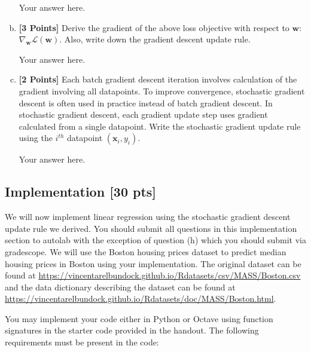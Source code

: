 \documentclass[a4paper]{article}
\theoremstyle{definition}
\def\x{\mathbf x}
\newenvironment{soln}{
    \leavevmode\color{red}\ignorespaces
}{}
\begin{document}
\begin{enumerate}[(a)]
\begin{soln}
Your answer here.
\end{soln}

\item {\bf [3 Points]} Derive the gradient of the above loss objective with respect to $\mathbf{w}$: $\nabla_{\mathbf{w}} \mathcal{L}(\mathbf{w})$. Also, write down the gradient descent update rule.

\begin{soln}
Your answer here.
\end{soln}

\item {\bf [2 Points]} Each batch gradient descent iteration involves calculation of the gradient involving all datapoints. To improve convergence, stochastic gradient descent is often used in practice instead of batch gradient descent. In stochastic gradient descent, each gradient update step uses gradient calculated from a single datapoint. Write the stochastic gradient update rule using the $i^{th}$ datapoint $(\x_i, y_i)$.

\begin{soln}
Your answer here.
\end{soln}

\end{enumerate}

\subsection{Implementation [30 pts]}

We will now implement linear regression using the stochastic gradient descent update rule we derived. You should submit all questions in this implementation section to autolab with the exception of question (h) which you should submit via gradescope. We will use the Boston housing prices dataset to predict median housing prices in Boston using your implementation. The original dataset can be found at \href{https://vincentarelbundock.github.io/Rdatasets/csv/MASS/Boston.csv}{https://vincentarelbundock.github.io/Rdatasets/csv/MASS/Boston.csv} and the data dictionary describing the dataset can be found at \href{https://vincentarelbundock.github.io/Rdatasets/doc/MASS/Boston.html}{https://vincentarelbundock.github.io/Rdatasets/doc/MASS/Boston.html}.

You may implement your code either in Python or Octave using function signatures in the starter code provided in the handout. The following requirements must be present in the code:
\end{document}
